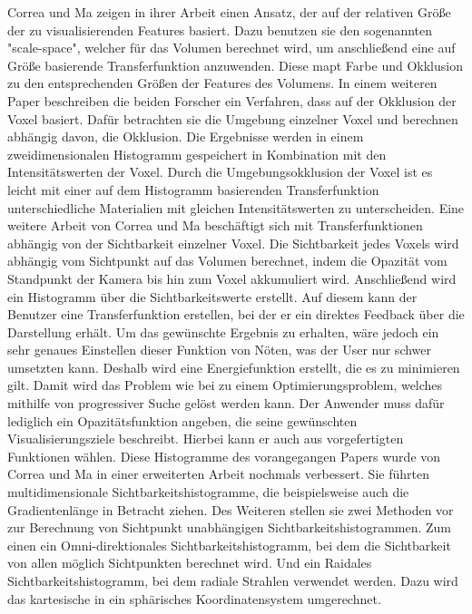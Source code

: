 Correa und Ma zeigen in ihrer Arbeit \cite{correa2008size} einen Ansatz, der auf der relativen Größe der zu visualisierenden Features basiert.
\newline
Dazu benutzen sie den sogenannten "scale-space", welcher für das Volumen berechnet wird, um anschließend eine auf Größe basierende Transferfunktion anzuwenden. Diese mapt Farbe und Okklusion zu den entsprechenden Größen der Features des Volumens.
\newline
In einem weiteren Paper \cite{correa2009occlusion} beschreiben die beiden Forscher ein Verfahren, dass auf der Okklusion der Voxel basiert.
\newline
Dafür betrachten sie die Umgebung einzelner Voxel und berechnen abhängig davon, die Okklusion. Die Ergebnisse werden in einem zweidimensionalen Histogramm gespeichert in Kombination mit den Intensitätswerten der Voxel. Durch die Umgebungsokklusion der Voxel ist es leicht mit einer auf dem Histogramm basierenden Transferfunktion unterschiedliche Materialien mit gleichen Intensitätswerten zu unterscheiden.
\newline
Eine weitere Arbeit \cite{correa2009visibility} von Correa und Ma beschäftigt sich mit Transferfunktionen abhängig von der Sichtbarkeit einzelner Voxel.
\newline
Die Sichtbarkeit jedes Voxels wird abhängig vom Sichtpunkt auf das Volumen berechnet, indem die Opazität vom Standpunkt der Kamera bis hin zum Voxel akkumuliert wird. Anschließend wird ein Histogramm über die Sichtbarkeitswerte erstellt. Auf diesem kann der Benutzer eine Transferfunktion erstellen, bei der er ein direktes Feedback über die Darstellung erhält. Um das gewünschte Ergebnis zu erhalten, wäre jedoch ein sehr genaues Einstellen dieser Funktion von Nöten, was der User nur schwer umsetzten kann. Deshalb wird eine Energiefunktion erstellt, die es zu minimieren gilt. Damit wird das Problem wie bei \cite{wu2007interactive}  zu einem Optimierungsproblem, welches mithilfe von progressiver Suche gelöst werden kann. Der Anwender muss dafür lediglich ein Opazitätsfunktion angeben, die seine gewünschten Visualisierungsziele beschreibt. Hierbei kann er auch aus vorgefertigten Funktionen wählen.
\newline
Diese Histogramme des vorangegangen Papers wurde von Correa und Ma in einer erweiterten Arbeit \cite{correa2011visibility} nochmals verbessert. Sie führten multidimensionale Sichtbarkeitshistogramme, die beispielsweise auch die Gradientenlänge in Betracht ziehen. Des Weiteren stellen sie zwei Methoden vor zur Berechnung von Sichtpunkt unabhängigen Sichtbarkeitshistogrammen. Zum einen ein Omni-direktionales Sichtbarkeitshistogramm, bei dem die Sichtbarkeit von allen möglich Sichtpunkten berechnet wird. Und ein Raidales Sichtbarkeitshistogramm, bei dem radiale Strahlen verwendet werden. Dazu wird das kartesische in ein sphärisches Koordinatensystem umgerechnet.


